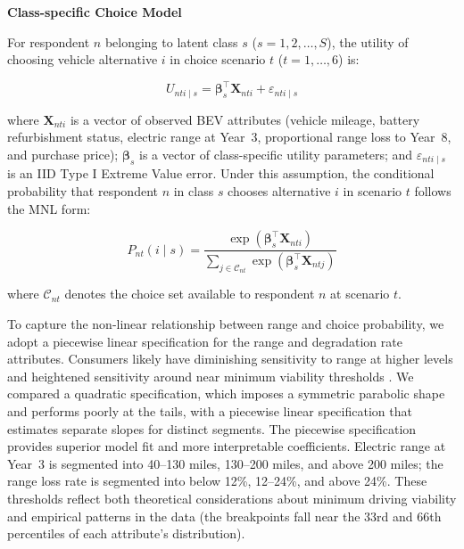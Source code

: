 \documentclass[a4paper,fleqn]{cas-sc}   %
\begin{document}
\vspace{\baselineskip}
\noindent \textbf{Class-specific Choice Model}\par

For respondent $n$ belonging to latent class $s$ ($s = 1, 2, \ldots, S$), the utility of choosing vehicle alternative $i$ in choice scenario $t$ ($t = 1, \ldots, 6$) is:

\begin{equation}
    U_{nti \mid s} = \boldsymbol{\beta}_s^{\top} \mathbf{X}_{nti} + \varepsilon_{nti \mid s}
    \label{eq:utility}
\end{equation}

\noindent where $\mathbf{X}_{nti}$ is a vector of observed BEV attributes (vehicle mileage, battery refurbishment status, electric range at Year~3, proportional range loss to Year~8, and purchase price); $\boldsymbol{\beta}_s$ is a vector of class-specific utility parameters; and $\varepsilon_{nti \mid s}$ is an IID Type I Extreme Value error. Under this assumption, the conditional probability that respondent $n$ in class $s$ chooses alternative $i$ in scenario $t$ follows the MNL form:

\begin{equation}
    P_{nt}(i \mid s) = \frac{\exp\!\left(\boldsymbol{\beta}_s^{\top} \mathbf{X}_{nti}\right)}{\displaystyle\sum_{j \in \mathcal{C}_{nt}} \exp\!\left(\boldsymbol{\beta}_s^{\top} \mathbf{X}_{ntj}\right)}
    \label{eq:conditional_choice}
\end{equation}

\noindent where $\mathcal{C}_{nt}$ denotes the choice set available to respondent $n$ at scenario $t$.

To capture the non-linear relationship between range and choice probability, we adopt a piecewise linear specification for the range and degradation rate attributes. Consumers likely have diminishing sensitivity to range at higher levels and heightened sensitivity around near minimum viability thresholds \parencite{dimitropoulosConsumerValuationChanges2013, hackbarthWillingnesstopayAlternativeFuel2016}. We compared a quadratic specification, which imposes a symmetric parabolic shape and performs poorly at the tails, with a piecewise linear specification that estimates separate slopes for distinct segments. The piecewise specification provides superior model fit and more interpretable coefficients. Electric range at Year~3 is segmented into 40--130 miles, 130--200 miles, and above 200 miles; the range loss rate is segmented into below 12\%, 12--24\%, and above 24\%. These thresholds reflect both theoretical considerations about minimum driving viability and empirical patterns in the data (the breakpoints fall near the 33rd and 66th percentiles of each attribute's distribution).
\end{document}
